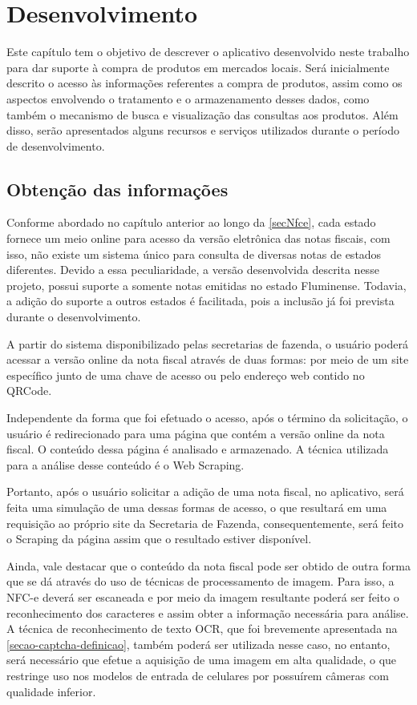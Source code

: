 \chapter{Desenvolvimento}

Este capítulo tem o objetivo de descrever o aplicativo desenvolvido neste trabalho para dar suporte à compra de produtos em mercados locais. Será inicialmente descrito o acesso às informações referentes a compra de produtos, assim como os aspectos envolvendo o tratamento e o armazenamento desses dados, como também o mecanismo de busca e visualização das consultas aos produtos. Além disso, serão apresentados alguns recursos e serviços utilizados durante o período de desenvolvimento.

\section{Obtenção das informações}
\label{obtencaoInformacoes}

Conforme abordado no capítulo anterior ao longo da \autoref{secNfce}, cada estado fornece um meio online para acesso da versão eletrônica das notas fiscais, com isso, não existe um sistema único para consulta de diversas notas de estados diferentes. Devido a essa peculiaridade, a versão desenvolvida descrita nesse projeto, possui suporte a somente notas emitidas no estado Fluminense. Todavia, a adição do suporte a outros estados é facilitada, pois a inclusão já foi prevista durante o desenvolvimento.

A partir do sistema disponibilizado pelas secretarias de fazenda, o usuário poderá acessar a versão online da nota fiscal através de duas formas: por meio de um site específico junto de uma chave de acesso ou pelo endereço web contido no QRCode.

Independente da forma que foi efetuado o acesso, após o término da solicitação, o usuário é redirecionado para uma página que contém a versão online da nota fiscal. O conteúdo dessa página é analisado e armazenado. A técnica utilizada para a análise desse conteúdo é o Web Scraping.

Portanto, após o usuário solicitar a adição de uma nota fiscal, no aplicativo, será feita uma simulação de uma dessas formas de acesso, o que resultará em uma requisição ao próprio site da Secretaria de Fazenda, consequentemente, será feito o Scraping da página assim que o resultado estiver disponível.

Ainda, vale destacar que o conteúdo da nota fiscal pode ser obtido de outra forma que se dá através do uso de técnicas de processamento de imagem. Para isso, a NFC-e deverá ser escaneada e por meio da imagem resultante poderá ser feito o reconhecimento dos caracteres e assim obter a informação necessária para análise. A técnica de reconhecimento de texto OCR, que foi brevemente apresentada na \autoref{secao-captcha-definicao}, também poderá ser utilizada nesse caso, no entanto, será necessário que efetue a aquisição de uma imagem em alta qualidade, o que restringe uso nos modelos de entrada de celulares por possuírem câmeras com qualidade inferior.

